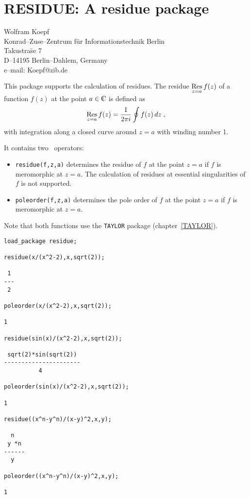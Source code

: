 \chapter{RESIDUE: A residue package}
\label{RESIDUE}

{\footnotesize
\begin{center}
Wolfram Koepf\\
Konrad--Zuse--Zentrum f\"ur Informationstechnik Berlin \\
Takustra\"se 7 \\
D--14195 Berlin--Dahlem, Germany \\[0.05in]
e--mail: Koepf@zib.de
\end{center}
}
\def\Res{\mathop{\rm Res}\limits}
\newcommand{\C}{{\rm {\mbox{C{\llap{{\vrule height1.52ex}\kern.4em}}}}}}

This package supports the calculation of residues. The residue
$\Res_{z=a} f(z)$ of a function $f(z)$ at the point $a\in\C$ is defined
as
\[
\Res_{z=a} f(z)=
\frac{1}{2 \pi i}\oint f(z)\,dz
\;,
\]
with integration along a closed curve around $z=a$ with winding number 1.

It contains two \REDUCE\ operators:

\begin{itemize}
\item
{\tt residue(f,z,a)} determines the residue of $f$ at
the point $z=a$ if $f$ is meromorphic at $z=a$.  The calculation of
residues at essential singularities of $f$ is not supported.
\item
{\tt poleorder(f,z,a)} determines the pole order
of $f$ at the point $z=a$ if $f$ is meromorphic at $z=a$.
\end{itemize}
Note that both functions use the {\tt TAYLOR} package (chapter~\ref{TAYLOR}).

\begin{verbatim}
load_package residue;

residue(x/(x^2-2),x,sqrt(2));

 1
---
 2

poleorder(x/(x^2-2),x,sqrt(2));

1

residue(sin(x)/(x^2-2),x,sqrt(2));

 sqrt(2)*sin(sqrt(2))
----------------------
          4

poleorder(sin(x)/(x^2-2),x,sqrt(2));

1

residue((x^n-y^n)/(x-y)^2,x,y);

  n
 y *n
------
  y

poleorder((x^n-y^n)/(x-y)^2,x,y);

1

\end{verbatim}

